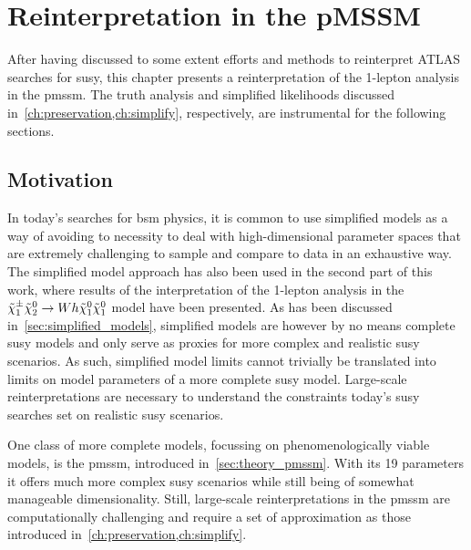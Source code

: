 
\chapter{Reinterpretation in the pMSSM}\label{ch:pmssm}

\ifpdf
    \graphicspath{{chapter-pmssm/Figs/Raster/}{chapter-pmssm/Figs/PDF/}{chapter-pmssm/Figs/}}
\else
    \graphicspath{{chapter-pmssm/Figs/Vector/}{chapter-pmssm/Figs/}}
\fi

After having discussed to some extent efforts and methods to reinterpret ATLAS searches for \gls{susy}, this chapter presents a reinterpretation of the 1-lepton analysis in the \gls{pmssm}. The truth analysis and simplified likelihoods discussed in~\cref{ch:preservation,ch:simplify}, respectively, are instrumental for the following sections. 

\section{Motivation}

In today's searches for \gls{bsm} physics, it is common to use simplified models as a way of avoiding to necessity to deal with high-dimensional parameter spaces that are extremely challenging to sample and compare to data in an exhaustive way. The simplified model approach has also been used in the second part of this work, where results of the interpretation of the 1-lepton analysis in the $\tilde{\chi}_1^\pm\tilde{\chi}_2^0\rightarrow Wh\tilde{\chi}_1^0\tilde{\chi}_1^0$ model have been presented. As has been discussed in~\cref{sec:simplified_models}, simplified models are however by no means complete \gls{susy} models and only serve as proxies for more complex and realistic \gls{susy} scenarios. As such, simplified model limits cannot trivially be translated into limits on model parameters of a more complete \gls{susy} model. Large-scale reinterpretations are necessary to understand the constraints today's \gls{susy} searches set on realistic \gls{susy} scenarios. 

One class of more complete models, focussing on phenomenologically viable models, is the \gls{pmssm}, introduced in~\cref{sec:theory_pmssm}. With its 19 parameters it offers much more complex \gls{susy} scenarios while still being of somewhat manageable dimensionality. Still, large-scale reinterpretations in the \gls{pmssm} are computationally challenging and require a set of approximation as those introduced in~\cref{ch:preservation,ch:simplify}.

